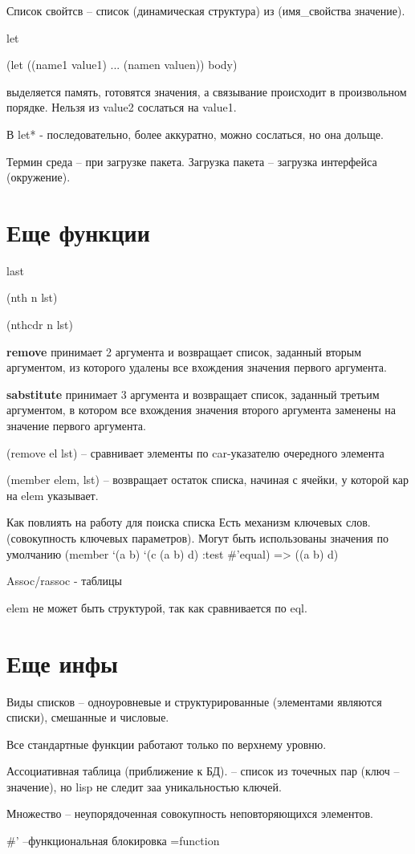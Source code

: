 \documentclass{article}
\begin{document}
Список свойтсв -- список (динамическая структура) из (имя\_свойства значение).

let

(let ((name1 value1) ... (namen valuen)) body)

выделяется память, готовятся значения, а связывание происходит в произвольном порядке. Нельзя из value2 сослаться на value1.

В let* - последовательно, более аккуратно, можно сослаться, но она дольще.

Термин среда -- при загрузке пакета. Загрузка пакета -- загрузка интерфейса (окружение).

\section*{Еще функции}

last

(nth n lst)

(nthcdr n lst)

\textbf{remove} принимает 2 аргумента и возвращает список, заданный вторым аргументом, из которого удалены все вхождения значения первого аргумента.

\textbf{sabstitute} принимает 3 аргумента и возвращает список, заданный третьим аргументом, в котором все вхождения значения второго аргумента заменены на значение первого аргумента.


(remove el lst) -- сравнивает элементы по car-указателю очередного элемента

(member elem, lst) -- возвращает остаток списка, начиная с ячейки,  у которой кар на elem указывает.

Как повлиять на работу для поиска списка
Есть механизм ключевых слов. (совокупность ключевых параметров). Могут быть использованы значения по умолчанию
(member ‘(a b) ‘(c (a b) d) :test #’equal) => ((a b) d)


Assoc/rassoc - таблицы


elem не может быть структурой, так как сравнивается по eql.

\section*{Еще инфы}

Виды списков -- одноуровневые и структурированные (элементами являются списки), смешанные и числовые.

Все стандартные функции работают только по верхнему уровню.

Ассоциативная таблица (приближение к БД). -- список из точечных пар (ключ -- значение), но lisp не следит заа уникальностью ключей.

Множество -- неупорядоченная совокупность неповторяющихся элементов.

\#' --функциональная блокировка =function
\end{document}
